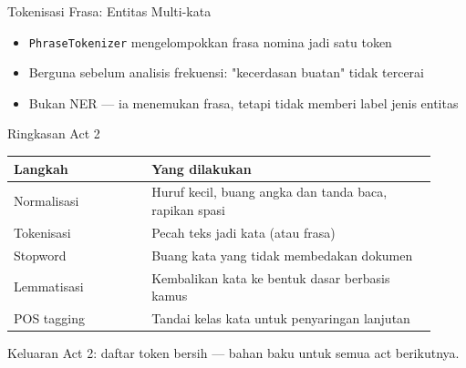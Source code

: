 \documentclass[aspectratio=169,t]{beamer}
\begin{document}
\begin{frame}{Tokenisasi Frasa: Entitas Multi-kata}
  \begin{center}
  \end{center}
  \vspace{0.6em}
  \begin{itemize}
    \footnotesize
    \item \texttt{PhraseTokenizer} mengelompokkan frasa nomina jadi satu token
    \item Berguna sebelum analisis frekuensi: "kecerdasan buatan" tidak tercerai
    \item Bukan NER --- ia menemukan frasa, tetapi tidak memberi label jenis entitas
  \end{itemize}
\end{frame}

\begin{frame}{Ringkasan Act 2}
  \begin{center}
  \renewcommand{\arraystretch}{1.25}
  {\footnotesize
  \begin{tabular}{@{}p{0.30\linewidth}p{0.62\linewidth}@{}}
    \toprule
    \rowcolor{nvcard!50}
    \textbf{Langkah} & \textbf{Yang dilakukan} \\
    \midrule
    Normalisasi & Huruf kecil, buang angka dan tanda baca, rapikan spasi \\
    Tokenisasi & Pecah teks jadi kata (atau frasa) \\
    Stopword & Buang kata yang tidak membedakan dokumen \\
    Lemmatisasi & Kembalikan kata ke bentuk dasar berbasis kamus \\
    POS tagging & Tandai kelas kata untuk penyaringan lanjutan \\
    \bottomrule
  \end{tabular}%
  }
  \end{center}
  \vspace{0.8em}
  \begin{center}
    {\color{nvlightgreen}\small Keluaran Act 2: daftar token bersih --- bahan baku untuk semua act berikutnya.}
  \end{center}
\end{frame}
\end{document}
